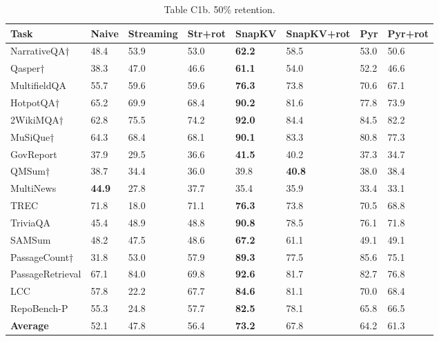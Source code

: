 \documentclass[10pt,letterpaper]{article}
\begin{document}
\begin{table}[H]
\centering
\small
\caption*{Table C1b. 50\% retention.}
\begin{tabular}{@{}llllllll@{}}
\toprule
Task & Naive & Streaming & Str+rot & SnapKV & SnapKV+rot & Pyr &
Pyr+rot\\
\midrule
    NarrativeQA† & 48.4 & 53.9 & 53.0 & \textbf{62.2} & 58.5 & 53.0 & 50.6\\
    Qasper† & 38.3 & 47.0 & 46.6 & \textbf{61.1} & 54.0 & 52.2 & 46.6\\
    MultifieldQA & 55.7 & 59.6 & 59.6 & \textbf{76.3} & 73.8 & 70.6 & 67.1\\
    HotpotQA† & 65.2 & 69.9 & 68.4 & \textbf{90.2} & 81.6 & 77.8 & 73.9\\
    2WikiMQA† & 62.8 & 75.5 & 74.2 & \textbf{92.0} & 84.4 & 84.5 & 82.2\\
    MuSiQue† & 64.3 & 68.4 & 68.1 & \textbf{90.1} & 83.3 & 80.8 & 77.3\\
    GovReport & 37.9 & 29.5 & 36.6 & \textbf{41.5} & 40.2 & 37.3 & 34.7\\
    QMSum† & 38.7 & 34.4 & 36.0 & 39.8 & \textbf{40.8} & 38.0 & 38.4\\
    MultiNews & \textbf{44.9} & 27.8 & 37.7 & 35.4 & 35.9 & 33.4 & 33.1\\
    TREC & 71.8 & 18.0 & 71.1 & \textbf{76.3} & 73.8 & 70.5 & 68.8\\
    TriviaQA & 45.4 & 48.9 & 48.8 & \textbf{90.8} & 78.5 & 76.1 & 71.8\\
    SAMSum & 48.2 & 47.5 & 48.6 & \textbf{67.2} & 61.1 & 49.1 & 49.1\\
    PassageCount† & 31.8 & 53.0 & 57.9 & \textbf{89.3} & 77.5 & 85.6 & 75.1\\
    PassageRetrieval & 67.1 & 84.0 & 69.8 & \textbf{92.6} & 81.7 & 82.7 & 76.8\\
    LCC & 57.8 & 22.2 & 67.7 & \textbf{84.6} & 81.1 & 70.0 & 68.4\\
    RepoBench-P & 55.3 & 24.8 & 57.7 & \textbf{82.5} & 78.1 & 65.8 & 66.5\\
    \textbf{Average} & 52.1 & 47.8 & 56.4 & \textbf{73.2} & 67.8 & 64.2 & 61.3\\
\bottomrule
\end{tabular}
\end{table}
\end{document}
